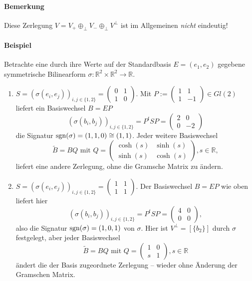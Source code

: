 \paragraph{Bemerkung}
	Diese Zerlegung $ V= V_+ \oplus_\perp V_- \oplus_\perp V^\perp $ ist im Allgemeinen \emph{nicht} eindeutig!
\paragraph{Beispiel}
	Betrachte eine durch ihre Werte auf der Standardbasis $ E=(e_1,e_2) $ gegebene symmetrische Bilinearform $ \sigma: \mathbb{R}^2\times \mathbb{R}^2 \to \mathbb{R} $.
		\begin{enumerate}
			\item $ S=(\sigma(e_i,e_j))_{i,j\in \{1,2\}} =
			\begin{pmatrix}
				0&1\\1& 0
			\end{pmatrix} $. Mit $ P:=\begin{pmatrix}
			1&1\\ 1& -1
			\end{pmatrix}\in Gl(2) $ liefert ein Basiswechsel $ B=EP $
				\[ (\sigma(b_i,b_j))_{i,j\in \{1,2\}} = P^tSP = \begin{pmatrix}
				2 & 0 \\ 0 & -2
				\end{pmatrix} \]
			die Signatur $ \operatorname{sgn}(\sigma) = (1,1,0)\cong (1,1) $.
			Jeder weitere Basiswechsel
				\[ \tilde{B}=BQ \text{ mit } Q = \begin{pmatrix}
				\cosh(s) & \sinh(s)\\ \sinh(s)& \cosh(s) 
				\end{pmatrix}, s\in \mathbb{R}, \]
			liefert eine andere Zerlegung, ohne die Gramsche Matrix zu ändern.
			\item $ S=(\sigma(e_i,e_j))_{i,j\in \{1,2\}}= \begin{pmatrix}
			1 & 1\\ 1 & 1
			\end{pmatrix}. $ Der Basiswechsel $ B=EP $ wie oben liefert hier
				\[ (\sigma(b_i,b_j))_{i,j\in \{1,2\}} = P^tSP = \begin{pmatrix}
				4 & 0 \\ 0 & 0
				\end{pmatrix}, \]
			also die Signatur $ \operatorname{sgn}(\sigma) = (1,0,1) $ von $ \sigma $. Hier ist $ V^\perp = [\{b_2\}]$ durch $ \sigma $ festgelegt, aber jeder Basiswechsel
				\[ \tilde{B} = BQ \text{ mit } Q= \begin{pmatrix}
				1 & 0 \\ s & 1
				\end{pmatrix}, s\in \mathbb{R} \]
			ändert die der Basis zugeordnete Zerlegung -- wieder ohne Änderung der Gramschen Matrix.
		\end{enumerate}